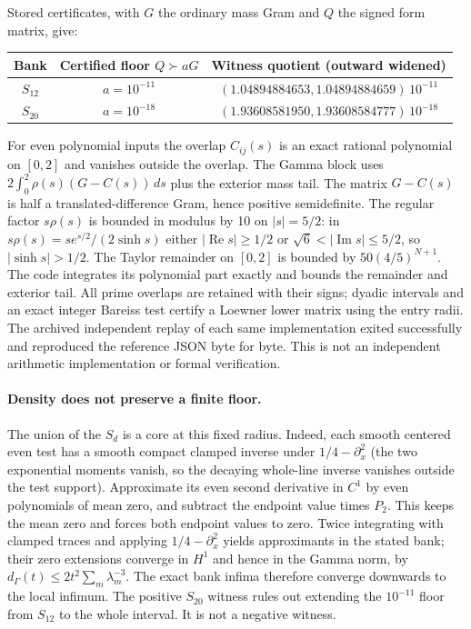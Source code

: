\documentclass[11pt]{article}
\begin{document}
Stored certificates, with $G$ the ordinary mass Gram and $Q$ the signed form matrix, give:
\begin{center}
\begin{tabular}{@{}ccc@{}}\toprule
Bank & Certified floor $Q\succ aG$ & Witness quotient (outward widened)\\\midrule
$S_{12}$ & $a=10^{-11}$ & $(1.04894884653,1.04894884659)\,10^{-11}$\\
$S_{20}$ & $a=10^{-18}$ & $(1.93608581950,1.93608584777)\,10^{-18}$\\\bottomrule
\end{tabular}
\end{center}
For even polynomial inputs the overlap $C_{ij}(s)$ is an exact rational polynomial on $[0,2]$ and vanishes outside the overlap. The Gamma block uses $2\int_0^2\rho(s)(G-C(s))\,ds$ plus the exterior mass tail. The matrix $G-C(s)$ is half a translated-difference Gram, hence positive semidefinite. The regular factor $s\rho(s)$ is bounded in modulus by 10 on $|s|=5/2$: in $s\rho(s)=s e^{s/2}/(2\sinh s)$ either $|\operatorname{Re}s|\ge 1/2$ or $\sqrt6<|\operatorname{Im}s|\le 5/2$, so $|\sinh s|>1/2$. The Taylor remainder on $[0,2]$ is bounded by $50(4/5)^{N+1}$. The code integrates its polynomial part exactly and bounds the remainder and exterior tail. All prime overlaps are retained with their signs; dyadic intervals and an exact integer Bareiss test certify a Loewner lower matrix using the entry radii. The archived independent replay of each same implementation exited successfully and reproduced the reference JSON byte for byte. This is not an independent arithmetic implementation or formal verification.

\paragraph{Density does not preserve a finite floor.}
The union of the $S_d$ is a core at this fixed radius. Indeed, each smooth centered even test has a smooth compact clamped inverse under $1/4-\partial_x^2$ (the two exponential moments vanish, so the decaying whole-line inverse vanishes outside the test support). Approximate its even second derivative in $C^1$ by even polynomials of mean zero, and subtract the endpoint value times $P_2$. This keeps the mean zero and forces both endpoint values to zero. Twice integrating with clamped traces and applying $1/4-\partial_x^2$ yields approximants in the stated bank; their zero extensions converge in $H^1$ and hence in the Gamma norm, by $d_\Gamma(t)\le 2t^2\sum_m\lambda_m^{-3}$. The exact bank infima therefore converge downwards to the local infimum. The positive $S_{20}$ witness rules out extending the $10^{-11}$ floor from $S_{12}$ to the whole interval. It is not a negative witness.
\end{document}
